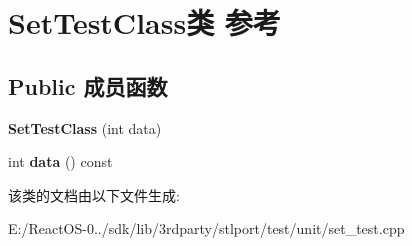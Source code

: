 \hypertarget{class_set_test_class}{}\section{Set\+Test\+Class类 参考}
\label{class_set_test_class}
\subsection*{Public 成员函数}
\begin{DoxyCompactItemize}
\item 
\mbox{\label{class_set_test_class_affb749984cb0de705c71cb943e238f90}} 
{\bfseries Set\+Test\+Class} (int data)
\item 
\mbox{\label{class_set_test_class_af8dbdaabe989f8028d17bdb26d064ab4}} 
int {\bfseries data} () const
\end{DoxyCompactItemize}


该类的文档由以下文件生成\+:\begin{DoxyCompactItemize}
\item 
E\+:/\+React\+O\+S-\/0../sdk/lib/3rdparty/stlport/test/unit/set\+\_\+test.\+cpp\end{DoxyCompactItemize}
